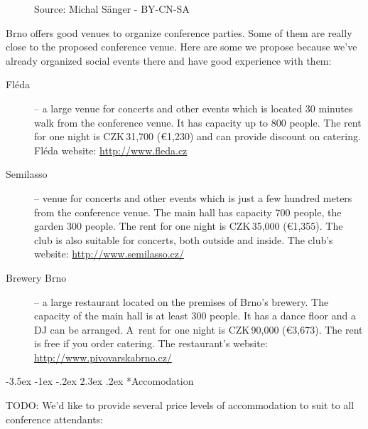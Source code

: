 \documentclass[10pt,a4paper]{article}
\makeatletter
\renewcommand\section{%
\@startsection{section}{1}{\z@}%
              {-3.5ex \@plus -1ex \@minus -.2ex}%
              {2.3ex \@plus.2ex}%
              {\color{kdelight}\sffamily\LARGE\bfseries}}
\makeatother
\begin{document}
\begin{figure}
\vspace{-22pt}
\begin{center}
\footnotesize{Source: Michal Sänger - BY-CN-SA}
\vspace{-20pt}
\end{center}
\end{figure}

Brno offers good venues to organize conference parties. Some of them are
really close to the proposed conference venue. Here are some we propose
because we've already organized social events there and have good
experience with them:

\begin{description}
\item[\color{kdedarker} Fléda] -- a large venue for concerts and other events which is located
30 minutes walk from the conference venue. It has capacity up to 800 people.
The rent for one night is CZK\,31,700 (\euro{1,230}) and can provide discount
on catering. Fléda website: \url{http://www.fleda.cz}
\item[\color{kdedarker} Semilasso] -- venue for concerts and other events which is
just a few hundred meters from the conference venue. The main hall
has capacity 700 people, the garden 300 people. The rent for one night
is CZK\,35,000 (\euro{1,355}). The club is also suitable for concerts,
both outside and inside. The club's website:
\url{http://www.semilasso.cz/}
\item[\color{kdedarker} Brewery Brno] -- a large restaurant located on the premises of
Brno's brewery. The capacity of the main hall is at least 300 people.
It has a dance floor and a DJ can be arranged. A~rent for one night is
CZK\,90,000 (\euro{3,673}). The rent is free if you order catering. The
restaurant's website:
\url{http://www.pivovarskabrno.cz/}
\end{description}

\cleardoublepage

\section*{Accomodation}
TODO:
We'd like to provide several price levels of accommodation to suit to all conference attendants:
\end{document}
